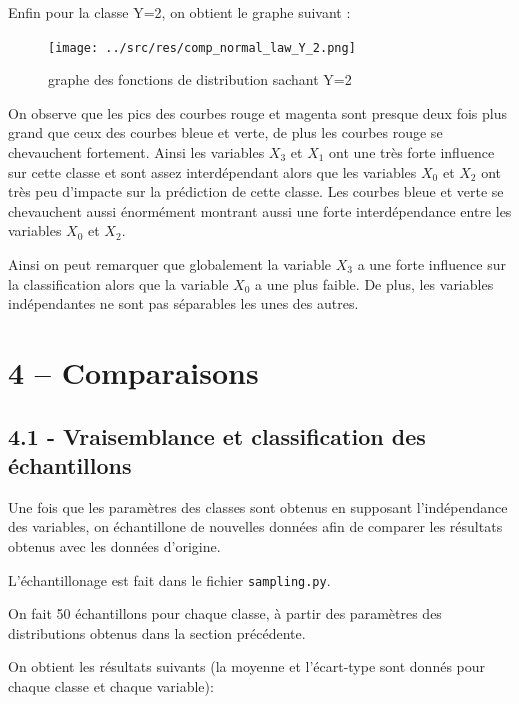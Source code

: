 \documentclass[
]{article}
\begin{document}
\newpage{}

Enfin pour la classe Y=2, on obtient le graphe suivant :

\begin{figure}
\centering
\texttt{[image: ../src/res/comp\_normal\_law\_Y\_2.png]}
\caption{graphe des fonctions de distribution sachant Y=2}
\end{figure}

On observe que les pics des courbes rouge et magenta sont presque deux
fois plus grand que ceux des courbes bleue et verte, de plus les courbes
rouge se chevauchent fortement. Ainsi les variables \(X_3\) et \(X_1\)
ont une très forte influence sur cette classe et sont assez
interdépendant alors que les variables \(X_0\) et \(X_2\) ont très peu
d'impacte sur la prédiction de cette classe. Les courbes bleue et verte
se chevauchent aussi énormément montrant aussi une forte interdépendance
entre les variables \(X_0\) et \(X_2\).

Ainsi on peut remarquer que globalement la variable \(X_3\) a une forte
influence sur la classification alors que la variable \(X_0\) a une plus
faible. De plus, les variables indépendantes ne sont pas séparables les
unes des autres.

\newpage{}

\section{4 -- Comparaisons}\label{comparaisons}

\subsection{4.1 - Vraisemblance et classification des
échantillons}\label{vraisemblance-et-classification-des-uxe9chantillons}

Une fois que les paramètres des classes sont obtenus en supposant
l'indépendance des variables, on échantillone de nouvelles données afin
de comparer les résultats obtenus avec les données d'origine.

L'échantillonage est fait dans le fichier \texttt{sampling.py}.

On fait 50 échantillons pour chaque classe, à partir des paramètres des
distributions obtenus dans la section précédente.

On obtient les résultats suivants (la moyenne et l'écart-type sont
donnés pour chaque classe et chaque variable):
\end{document}
